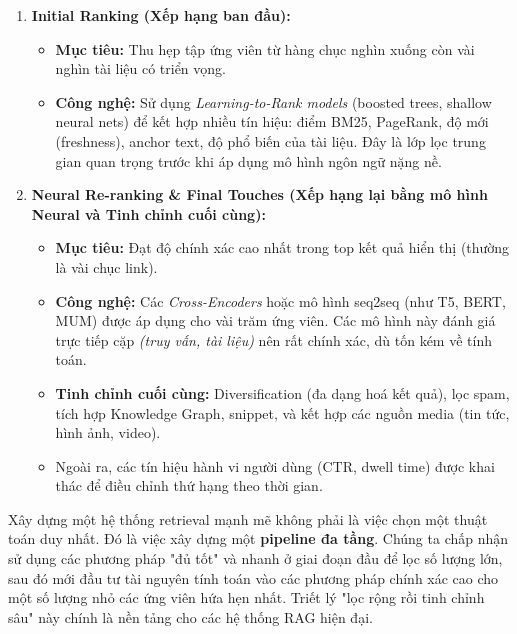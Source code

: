 \begin{enumerate}
    \item \textbf{Initial Ranking (Xếp hạng ban đầu):}
    \begin{itemize}
        \item \textbf{Mục tiêu:} Thu hẹp tập ứng viên từ hàng chục nghìn xuống còn vài nghìn tài liệu có triển vọng.
        \item \textbf{Công nghệ:} Sử dụng \emph{Learning-to-Rank models} (boosted trees, shallow neural nets) để kết hợp nhiều tín hiệu: điểm BM25, PageRank, độ mới (freshness), anchor text, độ phổ biến của tài liệu. Đây là lớp lọc trung gian quan trọng trước khi áp dụng mô hình ngôn ngữ nặng nề.
    \end{itemize}

    \item \textbf{Neural Re-ranking \& Final Touches (Xếp hạng lại bằng mô hình Neural và Tinh chỉnh cuối cùng):}
    \begin{itemize}
        \item \textbf{Mục tiêu:} Đạt độ chính xác cao nhất trong top kết quả hiển thị (thường là vài chục link).
        \item \textbf{Công nghệ:} Các \emph{Cross-Encoders} hoặc mô hình seq2seq (như T5, BERT, MUM) được áp dụng cho vài trăm ứng viên. Các mô hình này đánh giá trực tiếp cặp \emph{(truy vấn, tài liệu)} nên rất chính xác, dù tốn kém về tính toán.
        \item \textbf{Tinh chỉnh cuối cùng:} Diversification (đa dạng hoá kết quả), lọc spam, tích hợp Knowledge Graph, snippet, và kết hợp các nguồn media (tin tức, hình ảnh, video).
        \item Ngoài ra, các tín hiệu hành vi người dùng (CTR, dwell time) được khai thác để điều chỉnh thứ hạng theo thời gian.
    \end{itemize}
\end{enumerate}

\begin{tcolorbox}[
    title=Bài học cốt lõi cho RAG từ Google,
    colback=green!5!white, colframe=green!60!black, fonttitle=\bfseries
]
Xây dựng một hệ thống retrieval mạnh mẽ không phải là việc chọn một thuật toán duy nhất. Đó là việc xây dựng một \textbf{pipeline đa tầng}. Chúng ta chấp nhận sử dụng các phương pháp "đủ tốt" và nhanh ở giai đoạn đầu để lọc số lượng lớn, sau đó mới đầu tư tài nguyên tính toán vào các phương pháp chính xác cao cho một số lượng nhỏ các ứng viên hứa hẹn nhất. Triết lý "lọc rộng rồi tinh chỉnh sâu" này chính là nền tảng cho các hệ thống RAG hiện đại.
\end{tcolorbox}


